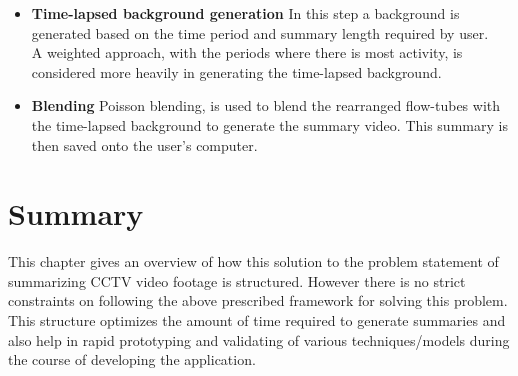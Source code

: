 \begin{itemize}
\begin{itemize}
    \end{itemize}


    \item \textbf{Time-lapsed background generation}
    In this step a background is generated based on the time period and summary
    length required by user. \\

    A weighted approach, with the periods where there is most activity, is
    considered more heavily in generating the time-lapsed background.

    \item \textbf{Blending}
    Poisson blending\cite{szeliski2011fast},\cite{Perez:2003:PIE:1201775.882269}
    is used to blend the rearranged flow-tubes with the time-lapsed background
    to generate the summary video. This summary is then saved onto the
    user’s computer.
\end{itemize}

\section{Summary}
This chapter gives an overview of how this solution to the problem
statement of summarizing CCTV video footage is structured. However there is no
strict constraints on following the above prescribed framework for solving this
problem. This structure optimizes the amount of time required to
generate summaries and also help in rapid prototyping and validating of various
techniques/models during the course of developing the application.